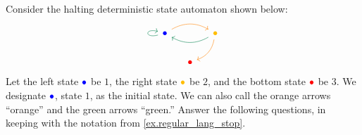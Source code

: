 \documentclass[Book-Poly]{subfiles}
\begin{document}
\begin{exercise}\label{exc.halt_dsa}
Consider the halting deterministic state automaton shown below:
\begin{equation} \label{eqn.halt_dsa}
\begin{tikzcd}[column sep=small]
	\bul[blue]\ar[rr, bend left, orange]\ar[loop left, dgreen]&&
	\bul[dyellow]\ar[dl, bend left, orange]\ar[ll, dgreen, bend left]\\&
	\bul[red]
\end{tikzcd}
\end{equation}
Let the left state $\bul[blue]$ be $1$, the right state $\bul[dyellow]$ be $2$, and the bottom state $\bul[red]$ be $3$.
We designate $\bul[blue]$, state $1$, as the initial state.
We can also call the orange arrows ``{\color{orange}orange}'' and the green arrows ``{\color{dgreen}green}.''
Answer the following questions, in keeping with the notation from \cref{ex.regular_lang_stop}.


\end{exercise}
\end{document}
